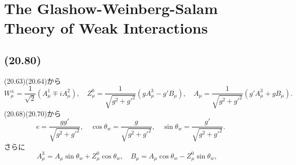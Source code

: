 \section{The Glashow-Weinberg-Salam Theory of Weak Interactions}
\subsection{(20.80)}
(20.63)(20.64)から
\[
W_\mu^\pm = \frac{1}{\sqrt{2}} (A_\mu^1 \mp iA_\mu^2) , \quad
Z_\mu^0 = \frac{1}{\sqrt{g^2+g'^2}} (gA_\mu^3 - g'B_\mu) , \quad
A_\mu = \frac{1}{\sqrt{g^2+g'^2}} (g'A_\mu^3 + gB_\mu) .
\]
(20.68)(20.70)から
\[
e = \frac{gg'}{\sqrt{g^2+g'^2}} , \quad
\cos\theta_w = \frac{g}{\sqrt{g^2+g'^2}} , \quad
\sin\theta_w = \frac{g'}{\sqrt{g^2+g'^2}} .
\]
さらに
\[
A_\mu^3 = A_\mu \sin\theta_w + Z_\mu^0 \cos\theta_w , \quad
B_\mu = A_\mu \cos\theta_w - Z_\mu^0 \sin\theta_w , \quad
\]


